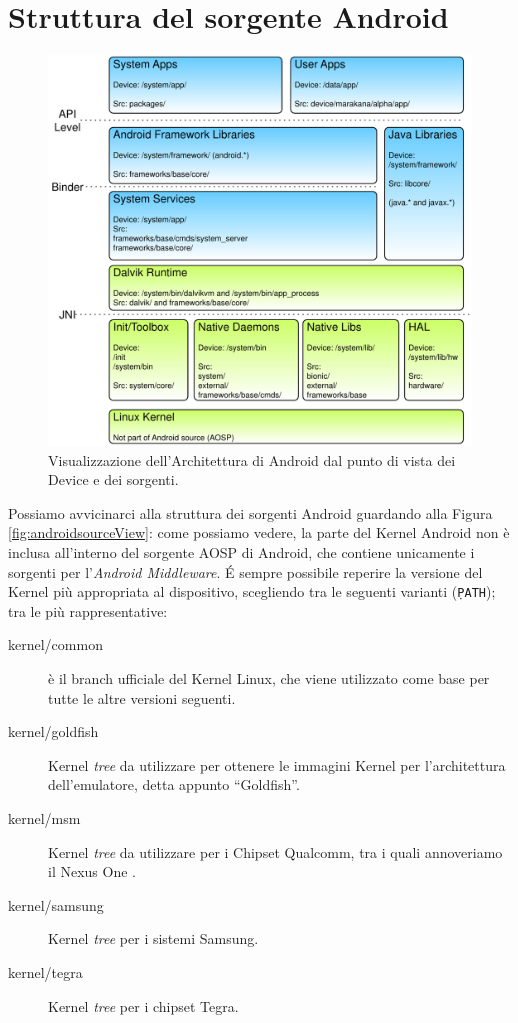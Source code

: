 \section{Struttura del sorgente Android}
\begin{figure}[thp]
\centering
\includegraphics[scale=0.7]{img/marak/asstd}
\caption{Visualizzazione dell'Architettura di Android dal punto di vista dei 
Device e dei sorgenti. \parencite{site:marakRemixing}}
\label{fig:androidsourceView}
\end{figure}
Possiamo avvicinarci alla struttura dei sorgenti Android guardando alla Figura
\vref{fig:androidsourceView}: come possiamo vedere, la parte del Kernel Android
non è inclusa all'interno del sorgente AOSP di Android, che contiene unicamente 
i sorgenti per l'\textit{Android Middleware}. É sempre possibile reperire
la versione del Kernel più appropriata al dispositivo, scegliendo tra le seguenti
varianti (\texttt{\small\d PATH}); tra le più rappresentative:
\begin{description}
\item[kernel/common]   è il branch ufficiale del Kernel Linux, che viene utilizzato come base per tutte le altre versioni seguenti.
\item[kernel/goldfish] Kernel \textit{tree} da utilizzare per ottenere le immagini Kernel per l'architettura dell'emulatore, detta appunto ``Goldfish''.
\item[kernel/msm] Kernel \textit{tree} da utilizzare per i Chipset Qualcomm, tra i quali annoveriamo il Nexus One \parencite{tesi:nexus}.
\item[kernel/samsung]  Kernel \textit{tree} per i sistemi Samsung.
\item[kernel/tegra]    Kernel \textit{tree} per i chipset Tegra.
\end{description}


